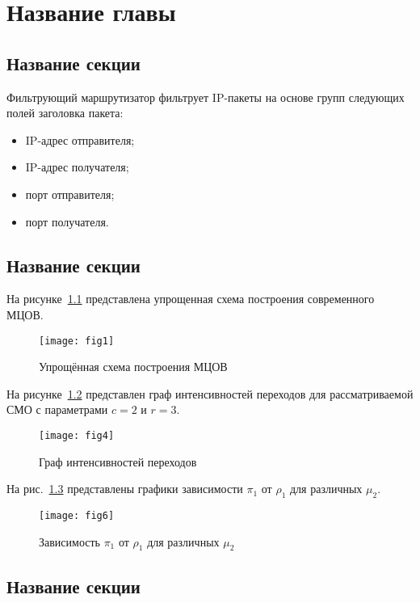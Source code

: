 
\chapter{Название главы}
\label{chap1}

\section{Название секции}
\label{chap1:sec1}

% 
Фильтрующий маршрутизатор фильтрует IP-пакеты на основе групп
следующих полей заголовка пакета:

\begin{itemize}
\item IP-адрес отправителя;
\item IP-адрес получателя;
\item порт отправителя;
\item порт получателя.
\end{itemize}

\section{Название секции}
\label{chap1:sec2}

%
На рисунке~\ref{fig1} представлена упрощенная схема построения
современного МЦОВ. 
\begin{figure}[h!]
 \centerline{\texttt{[image: fig1]}}
 \caption{Упрощённая схема построения МЦОВ}
\label{fig1}
\end{figure}

На рисунке~\ref{fig4} представлен граф интенсивностей переходов
для рассматриваемой СМО с параметрами $c = 2$ и $r = 3$.
\begin{figure}[h!]
 \centerline{\texttt{[image: fig4]}}
 \caption{Граф интенсивностей переходов}
\label{fig4}
\end{figure}

На рис.~\ref{fig6} представлены графики зависимости $\pi _1 $ от
$\rho _1 $ для различных $\mu _2 $.
\begin{figure}[!h]
\centerline{\texttt{[image: fig6]}}
\caption{Зависимость $\pi _1 $ от $\rho _1 $ для различных $\mu _2 $}
\label{fig6}
\end{figure}



\section{Название секции}
\label{chap1:sec3}

